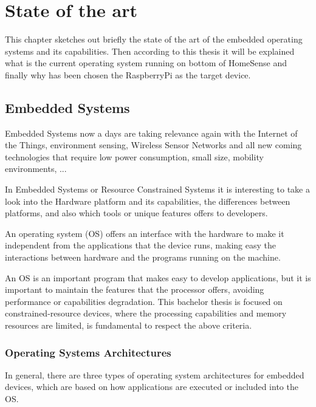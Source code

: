 \chapter{State of the art}\label{C:State-Art}

This chapter sketches out briefly the state of the art of the embedded operating systems and its capabilities. Then according to this thesis it will be explained what is the current operating system running on bottom of HomeSense and finally why has been chosen the RaspberryPi as the target device.

\section{Embedded Systems}\label{S:Embedded-Systems}
Embedded Systems now a days are taking relevance again with the Internet of the Things, environment sensing, Wireless Sensor Networks and all new coming technologies that require low power consumption, small size, mobility environments, ...

In Embedded Systems or Resource Constrained Systems it is interesting to take a look into the Hardware platform and its capabilities, the differences between platforms, and also which tools or unique features offers to developers.

An operating system (OS) offers an interface with the hardware to make it independent from the applications that the device runs, making easy the interactions between hardware and the programs running on the machine.

An OS is an important program that makes easy to develop applications, but it is important to maintain the features that the processor offers, avoiding performance or capabilities degradation. 
This bachelor thesis is focused on constrained-resource devices, where the processing capabilities and memory resources are limited, is fundamental to respect the above criteria.

\subsection{Operating Systems Architectures}\label{Operating-Systems-Architectures}
In general, there are three types of operating system architectures for embedded devices, which are based on how applications are executed or included into the OS.

